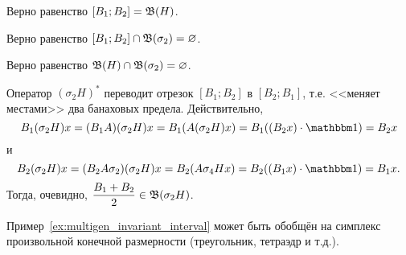 \begin{hypothesis}
	Верно равенство $[B_1; B_2] = \mathfrak{B}(H)$.
\end{hypothesis}

\begin{hypothesis}
	Верно равенство $[B_1; B_2] \cap \mathfrak{B}(\sigma_2) = \varnothing$.
\end{hypothesis}

\begin{hypothesis}
	Верно равенство $\mathfrak{B}(H) \cap \mathfrak{B}(\sigma_2) = \varnothing$.
\end{hypothesis}

\begin{remark}
	Оператор $(\sigma_2 H)^*$ переводит отрезок $[B_1; B_2]$ в $[B_2; B_1]$,
	т.е. <<меняет местами>> два банаховых предела.
	Действительно,
	\begin{equation}
		B_1 (\sigma_2 H)x  = (B_1 A) (\sigma_2 H)x = B_1 (A(\sigma_2 H)x)  = B_1 ((B_2 x) \cdot \one) = B_2 x
	\end{equation}
	и
	\begin{equation}
		B_2 (\sigma_2 H)x  = (B_2 A\sigma_2) (\sigma_2 H)x = B_2 (A\sigma_4 Hx)  = B_2 ((B_1 x) \cdot \one) = B_1 x
		.
	\end{equation}
	Тогда, очевидно, $\dfrac{B_1 + B_2}2 \in \mathfrak{B}(\sigma_2 H)$.
\end{remark}

\begin{hypothesis}
	Пример~\ref{ex:multigen_invariant_interval} может быть обобщён на симплекс произвольной конечной размерности
	(треугольник, тетраэдр и т.д.).
\end{hypothesis}
